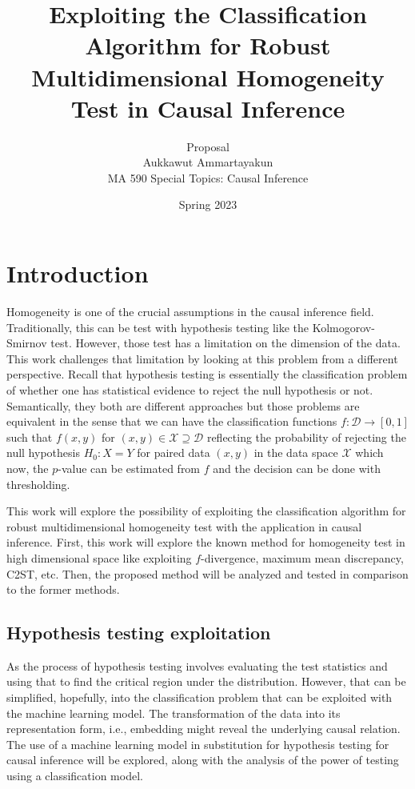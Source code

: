 \documentclass{article}
\title{
    Exploiting the Classification Algorithm for Robust Multidimensional Homogeneity Test in Causal Inference}
\author{Proposal\\Aukkawut Ammartayakun\\MA 590 Special Topics: Causal Inference}
\date{Spring 2023}
\begin{document}
\maketitle
%
%
%            
%
%


\section{Introduction}
Homogeneity is one of the crucial assumptions in the causal inference field. 
Traditionally, this can be test with hypothesis testing like the Kolmogorov-Smirnov test. 
However, those test has a limitation on the dimension of the data.
This work challenges that limitation by looking at this problem from a different perspective. 
Recall that hypothesis testing is essentially the classification problem of whether one has statistical evidence to reject the null hypothesis or not. 
Semantically, they both are different approaches but those problems are equivalent in the sense that we can have the classification functions 
$f:\mathcal{D}\rightarrow [0,1]$ such that $f(x,y)$ for $(x,y)\in\mathcal{X} \supseteq \mathcal{D}$ reflecting the probability of rejecting the null hypothesis $H_0: X = Y$ 
for paired data $(x,y)$ in the data space $\mathcal{X}$ which now, the $p$-value can be estimated from $f$ and the decision can be done with thresholding.

This work will explore the possibility of exploiting the classification algorithm for robust multidimensional homogeneity test with the application in causal inference.
First, this work will explore the known method for homogeneity test in high dimensional space like exploiting $f$-divergence, maximum mean discrepancy, C2ST, etc. 
Then, the proposed method will be analyzed and tested in comparison to the former methods.
\subsection{Hypothesis testing exploitation}
As the process of hypothesis testing involves evaluating the test statistics and using that 
to find the critical region under the distribution. However, that can be simplified, hopefully, 
into the classification problem that can be exploited with the machine learning model. 
The transformation of the data into its representation form, i.e., embedding might reveal 
the underlying causal relation. The use of a machine learning model in substitution for 
hypothesis testing for causal inference will be explored, along with the analysis of the power 
of testing using a classification model.
\end{document}
